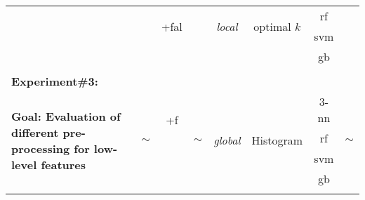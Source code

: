 \begin{landscape}
\begin{table}[ht]
{\begin{center}
{\begin{tabular}{l  c	 c  c  c  c  c  c  }
 & & \multirow{2}{*}{+\acs{fal}} & & \multirow{2}{*}{\emph{local}} & \multirow{2}{*}{optimal $k$} & \ac{rf} &  \\
 & & & & & & \ac{svm} &  \\
 & & & & & & \ac{gb} &  \\
\midrule
\\
\textbf{Experiment\#3:}\\
\multirow{4}{4cm}{\textbf{Goal: Evaluation of different pre-processing for low-level features}} & \multirow{4}{*}{$\sim$} & \multirow{2}{*}{ +\acs{f}} & \multirow{4}{*}{$\sim$} & \multirow{4}{*}{\emph{global}} & \multirow{4}{*}{Histogram} & $3$-\ac{nn} & \multirow{4}{*}{$\sim$}\\
& & \multirow{2}{*}{+\ac{fal}} & & & & \ac{rf} &  \\
& & & & & & \ac{svm} &  \\
& & & & & & \ac{gb} &  \\
\\
\bottomrule


\end{tabular}}
\end{center}}
\label{tab:experiment_summary}
\end{table}
\end{landscape}
